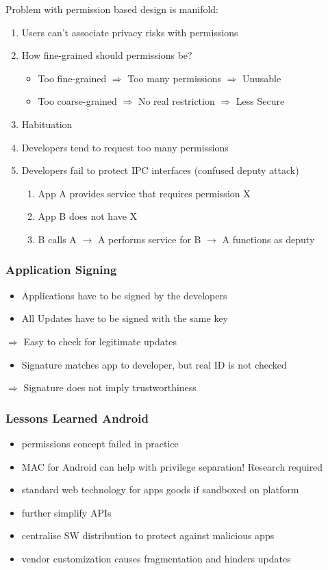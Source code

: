 Problem with permission based design is manifold:
\begin{enumerate}
    \item Users can't associate privacy risks with permissions
    \item How fine-grained should permissions be?
      \begin{itemize}
	\item Too fine-grained $\Rightarrow$ Too many permissions $\Rightarrow$ Unusable
	\item Too coarse-grained $\Rightarrow$ No real restriction $\Rightarrow$ Less Secure
      \end{itemize}
    \item Habituation
    \item Developers tend to request too many permissions
    \item Developers fail to protect IPC interfaces (confused deputy attack)
      \begin{enumerate}
      	\item App A provides service that requires permission X
	\item App B does not have X
	\item B calls A $\rightarrow$ A performs service for B $\rightarrow$ A functions as deputy
      \end{enumerate}
\end{enumerate}

\subsubsection{Application Signing}
\begin{itemize}
	\item Applications have to be signed by the developers
	\item All Updates have to be signed with the same key
\end{itemize}
$\Rightarrow$ Easy to check for legitimate updates
\begin{itemize}
\item Signature matches app to developer, but real ID is not checked
\end{itemize}
$\Rightarrow$ Signature does not imply trustworthiness

\subsubsection{Lessons Learned Android}
\begin{itemize}
    \item permissions concept failed in practice
    \item MAC for Android can help with privilege separation! Research required
    \item standard web technology for apps goods if sandboxed on platform
    \item further simplify APIs
    \item centralise SW distribution to protect against malicious apps
    \item vendor customization causes fragmentation and hinders updates
\end{itemize}

